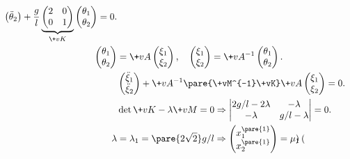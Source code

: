 \documentclass{ctexart}
\begin{document}
\begin{sample}
\begin{ex}
\begin{align*}
\begin{pmatrix}
                \ddot{\theta}_2
            \end{pmatrix} + \frac{g}{l} \underbrace{\begin{pmatrix}
                2 & 0 \\ 0 & 1
            \end{pmatrix}}_{\+vK}\begin{pmatrix}
                \theta_1 \\ \theta_2
            \end{pmatrix} = 0. \\
            \begin{pmatrix}
                \theta_1 \\ \theta_2
            \end{pmatrix} &= \+vA \begin{pmatrix}
                \xi_1 \\ \xi_2
            \end{pmatrix},\quad \begin{pmatrix}
                \xi_1 \\ \xi_2
            \end{pmatrix} = \+vA^{-1}\begin{pmatrix}
                \theta_1 \\ \theta_2
            \end{pmatrix}. \\
            & \begin{pmatrix}
                \ddot{\xi}_1 \\ \ddot{\xi}_2
            \end{pmatrix} + \+vA^{-1}\pare{\+vM^{-1}\+vK}\+vA \begin{pmatrix}
                \xi_1 \\ \xi_2
            \end{pmatrix} = 0. \\
            & \det{\+vK - \lambda \+vM} = 0 \Rightarrow \begin{vmatrix}
                2g/l - 2\lambda & -\lambda \\ -\lambda & g/l - \lambda
            \end{vmatrix} = 0. \\
            \lambda &= \lambda_1 = \pare{2\sqrt{2}}g/l\Rightarrow \begin{pmatrix}
                x_1^{\pare{1}} \\ x_2^{\pare{1}}
            \end{pmatrix} = \mu_1 \begin{pmatrix}

\end{pmatrix}
\end{align*}
\end{ex}
\end{sample}
\end{document}
